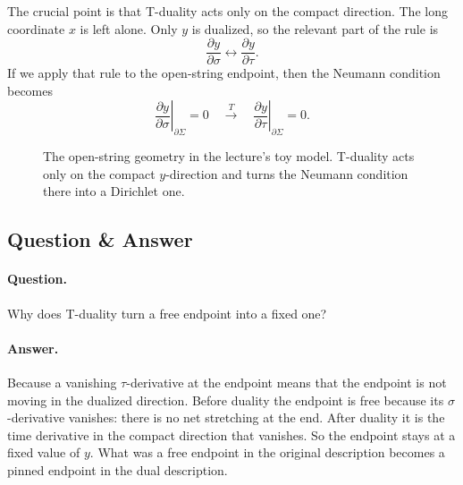 The crucial point is that T-duality acts only on the compact direction. The long coordinate \(x\) is left alone. Only \(y\) is dualized, so the relevant part of the rule is
\begin{equation}
\frac{\partial y}{\partial \sigma}\leftrightarrow \frac{\partial y}{\partial \tau}.
\end{equation}
If we apply that rule to the open-string endpoint, then the Neumann condition becomes
\begin{equation}
\left.\frac{\partial y}{\partial \sigma}\right|_{\partial\Sigma}=0
\quad \xrightarrow{\,T\,} \quad
\left.\frac{\partial y}{\partial \tau}\right|_{\partial\Sigma}=0.
\end{equation}

\begin{figure}[htbp]
\centering
{}
\caption{The open-string geometry in the lecture's toy model. T-duality acts only on the compact \(y\)-direction and turns the Neumann condition there into a Dirichlet one.}
\end{figure}

\subsection{Question \& Answer}

\paragraph{Question.} Why does T-duality turn a free endpoint into a fixed one?

\paragraph{Answer.} Because a vanishing \(\tau\)-derivative at the endpoint means that the endpoint is not moving in the dualized direction. Before duality the endpoint is free because its \(\sigma\)-derivative vanishes: there is no net stretching at the end. After duality it is the time derivative in the compact direction that vanishes. So the endpoint stays at a fixed value of \(y\). What was a free endpoint in the original description becomes a pinned endpoint in the dual description.


